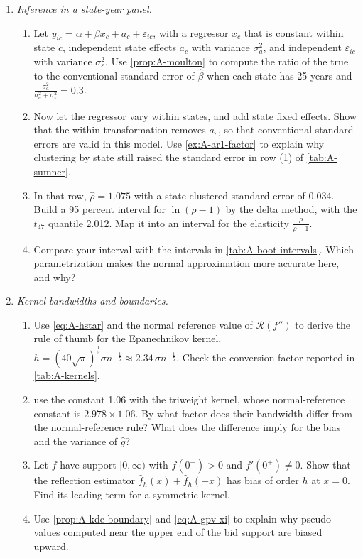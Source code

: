 \begin{enumerate}[label=\arabic*., leftmargin=*, itemsep=6pt]
\item \textit{Inference in a state-year panel.}
\begin{enumerate}[label=(\alph*)]
  \item Let $y_{ic} = \alpha + \beta x_c + a_c + \varepsilon_{ic}$, with a regressor $x_c$ that is constant within state
  $c$, independent state effects $a_c$ with variance $\sigma_a^2$, and independent $\varepsilon_{ic}$ with variance
  $\sigma_\varepsilon^2$. Use \cref{prop:A-moulton} to compute the ratio of the true to the conventional standard error
  of $\hat\beta$ when each state has 25 years and $\frac{\sigma_a^2}{\sigma_a^2 + \sigma_\varepsilon^2} = 0.3$.
  \item Now let the regressor vary within states, and add state fixed effects. Show that the within transformation
  removes $a_c$, so that conventional standard errors are valid in this model. Use \cref{ex:A-ar1-factor} to explain
  why clustering by state still raised the standard error in row (1) of \cref{tab:A-sumner}.
  \item In that row, $\hat\rho = 1.075$ with a state-clustered standard error of 0.034. Build a 95 percent interval for
  $\ln(\rho - 1)$ by the delta method, with the $t_{47}$ quantile 2.012. Map it into an interval for the elasticity
  $\frac{\rho}{\rho - 1}$.
  \item Compare your interval with the intervals in \cref{tab:A-boot-intervals}. Which parametrization makes the normal
  approximation more accurate here, and why?
\end{enumerate}

\item \textit{Kernel bandwidths and boundaries.}
\begin{enumerate}[label=(\alph*)]
  \item Use \eqref{eq:A-hstar} and the normal reference value of $\mathcal{R}(f'')$ to derive the rule of thumb for the
  Epanechnikov kernel, $h = (40\sqrt\pi)^{\frac{1}{5}}\sigma n^{-\frac{1}{5}} \approx 2.34\,\sigma n^{-\frac{1}{5}}$.
  Check the conversion factor reported in \cref{tab:A-kernels}.
  \item \citet{GuerrePerrigneVuong2000} use the constant 1.06 with the triweight kernel, whose normal-reference
  constant is $2.978 \times 1.06$. By what factor does their bandwidth differ from the normal-reference rule? What
  does the difference imply for the bias and the variance of $\hat g$?
  \item Let $f$ have support $[0, \infty)$ with $f(0^+) > 0$ and $f'(0^+) \neq 0$. Show that the reflection estimator
  $\hat f_h(x) + \hat f_h(-x)$ has bias of order $h$ at $x = 0$. Find its leading term for a symmetric kernel.
  \item Use \cref{prop:A-kde-boundary} and \eqref{eq:A-gpv-xi} to explain why pseudo-values computed near the upper end
  of the bid support are biased upward.
\end{enumerate}


\end{enumerate}
